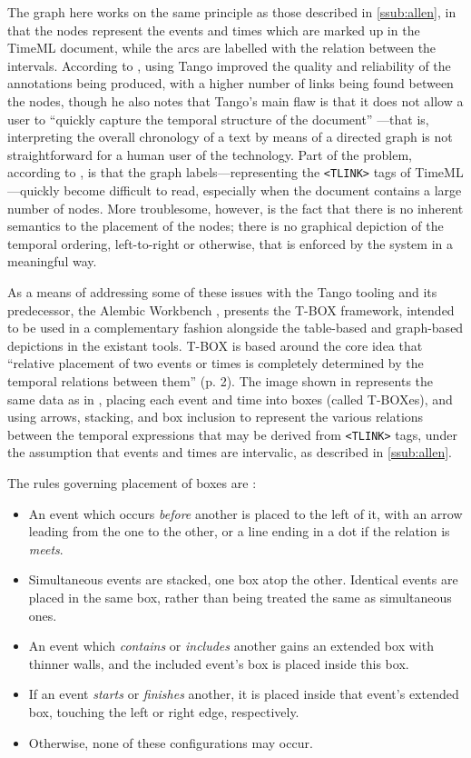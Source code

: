 \documentclass[a4paper,12pt,leqno]{article}
\begin{document}
The graph here works on the same principle as those described in \cref{ssub:allen}, in that the nodes represent the events and times which are marked up in the TimeML document, while the arcs are labelled with the relation between the intervals. According to \citet[p. 2]{verhagen2005TBOX}, using Tango improved the quality and reliability of the annotations being produced, with a higher number of links being found between the nodes, though he also notes that Tango's main flaw is that it does not allow a user to ``quickly capture the temporal structure of the document'' \citep[p. 2]{verhagen2005TBOX}---that is, interpreting the overall chronology of a text by means of a directed graph is not straightforward for a human user of the technology. Part of the problem, according to \citet{verhagen2005TBOX}, is that the graph labels---representing the \verb|<TLINK>| tags of TimeML---quickly become difficult to read, especially when the document contains a large number of nodes. More troublesome, however, is the fact that there is no inherent semantics to the placement of the nodes; there is no graphical depiction of the temporal ordering, left-to-right or otherwise, that is enforced by the system in a meaningful way.

As a means of addressing some of these issues with the Tango tooling and its predecessor, the Alembic Workbench \citep{day1997mixed}, \citet{verhagen2005TBOX} presents the T-BOX framework, intended to be used in a complementary fashion alongside the table-based and graph-based depictions in the existant tools. T-BOX is based around the core idea that ``relative placement of two events or times is completely determined by the temporal relations between them'' (p. 2). The image shown in  represents the same data as in , placing each event and time into boxes (called T-BOXes), and using arrows, stacking, and box inclusion to represent the various relations between the temporal expressions that may be derived from \verb|<TLINK>| tags, under the assumption that events and times are intervalic, as described in \cref{ssub:allen}.

The rules governing placement of boxes are \citep[pp. 3--5]{verhagen2005TBOX}:
\begin{itemize}
	\item An event which occurs \textit{before} another is placed to the left of it, with an arrow leading from the one to the other, or a line ending in a dot if the relation is \textit{meets}.
	\item Simultaneous events are stacked, one box atop the other. Identical events are placed in the same box, rather than being treated the same as simultaneous ones.
	\item An event which \textit{contains} or \textit{includes} another gains an extended box with thinner walls, and the included event's box is placed inside this box.
	\item If an event \textit{starts} or \textit{finishes} another, it is placed inside that event's extended box, touching the left or right edge, respectively.
	\item Otherwise, none of these configurations may occur.
\end{itemize}
\end{document}
